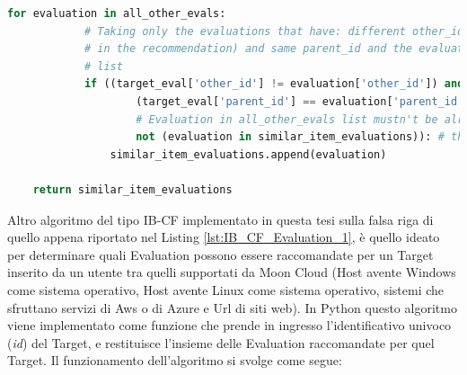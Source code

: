 \begin{itemize}
\begin{lstlisting}[language=Python, label=lst:IB_CF_Evaluation_3]
        for evaluation in all_other_evals:
            # Taking only the evaluations that have: different other_id (excluding the target evaluation
            # in the recommendation) and same parent_id and the evaluations that weren't added to similar_item_evaluations
            # list
            if ((target_eval['other_id'] != evaluation['other_id']) and  # Evaluations must have different 'other_id'
                    (target_eval['parent_id'] == evaluation['parent_id']) and  # Evaluations must have same 'parent_id'
                    # Evaluation in all_other_evals list mustn't be already added to \
                    not (evaluation in similar_item_evaluations)): # the 'similar_item_evaluations' list
                similar_item_evaluations.append(evaluation)
    
    return similar_item_evaluations 
    \end{lstlisting}
\end{itemize}
Altro algoritmo del tipo IB-CF implementato in questa tesi sulla falsa riga di quello appena riportato nel Listing \ref{lst:IB_CF_Evaluation_1}, 
è quello ideato per determinare quali Evaluation possono essere raccomandate per un Target inserito da un utente tra quelli supportati da Moon Cloud
(Host avente Windows come sistema operativo, Host avente Linux come sistema operativo, sistemi che sfruttano 
servizi di Aws o di Azure e Url di siti web).\hfill\break
In Python questo algoritmo viene implementato come funzione che prende in ingresso l'identificativo univoco (\textit{id}) del Target, e 
restituisce l'insieme delle Evaluation raccomandate per quel Target. Il funzionamento dell'algoritmo si svolge come segue:
